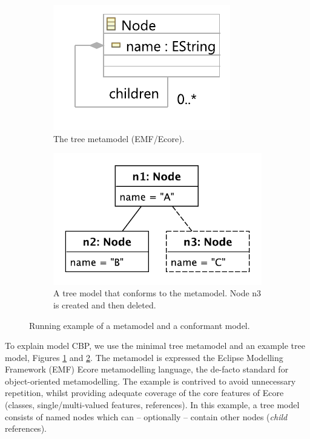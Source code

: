 \documentclass{llncs}
\begin{document}
    \begin{figure}[ht]
        \begin{subfigure}[t]{0.4\linewidth}
            \centering
            \includegraphics[width=0.8\linewidth]{node_metamodel}
            \caption{The tree metamodel (EMF/Ecore).}
            \label{fig:tree_metamodel}
        \end{subfigure}
        \hfill
        \begin{subfigure}[t]{0.6\linewidth}
            \centering
            \includegraphics[width=0.6\linewidth]{initial_chart}
            \caption{A tree model that conforms to the  metamodel.  Node n3 is created and then deleted.}
            \label{fig:initial_model}
        \end{subfigure}
        \caption{Running example of a metamodel and a conformant model.}
        \label{fig:append_speed}
    \end{figure}

    To explain model CBP, we use the minimal tree metamodel and an example tree model, Figures \ref{fig:tree_metamodel} and \ref{fig:initial_model}.
    The metamodel is expressed the Eclipse Modelling Framework (EMF) Ecore metamodelling language, the de-facto standard for object-oriented metamodelling.  The example is contrived to avoid unnecessary repetition, whilst providing adequate coverage of the core features of Ecore (classes, single/multi-valued features, references).
    In this example, a tree model consists of named nodes which can -- optionally -- contain other nodes (\emph{child} references).
   
\end{document}
